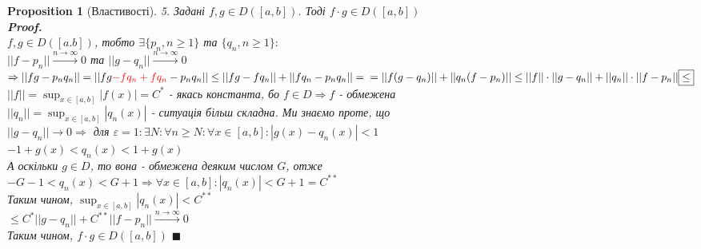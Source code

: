 \documentclass[a4paper, 14pt]{extarticle}
\def\huge{\displaystyle}
\def\bigline{\vspace{5mm}\\}
\theoremstyle{theoremdd}
\theoremstyle{theoremdd}
\theoremstyle{theoremdd}
\theoremstyle{theoremdd}
\theoremstyle{theoremdd}
\newtheorem{proposition}[theorem]{Proposition}
\theoremstyle{theoremdd}
\theoremstyle{theoremdd}
\theoremstyle{theoremdd}
\newenvironment{pfNoTh}{\textbf{Proof. \\}}{$\blacksquare$}
\begin{document}
\begin{proposition}[Властивості]
5. Задані $f,g \in D([a,b])$. Тоді $f \cdot g \in D([a,b])$\\
\begin{pfNoTh}
$f,g \in D([a.b])$, тобто $\exists \{p_n, n \geq 1\}$ та $\{q_n, n \geq 1\}:$\\
$||f-p_n|| \overset{n \to \infty}{\longrightarrow} 0$ та $||g-q_n|| \overset{n \to \infty}{\longrightarrow} 0$\\
$\Rightarrow ||fg - p_n q_n|| = ||fg \textcolor{red}{- fq_n + fq_n} - p_n q_n|| \leq ||fg - fq_n|| + ||fq_n - p_nq_n|| = \\ = ||f(g-q_n)|| + ||q_n(f-p_n)|| \leq ||f|| \cdot ||g-q_n|| + ||q_n|| \cdot ||f-p_n|| \boxed{\leq}$\\
$||f|| = \huge \sup_{x \in [a,b]} |f(x)| = C^*$ - якась константа, бо $f \in D \Rightarrow f$ - обмежена\\
$||q_n|| = \huge \sup_{x \in [a,b]} |q_n(x)|$ - ситуація більш складна. Ми знаємо проте, що\\
$||g - q_n|| \to 0 \Rightarrow$ для $\varepsilon = 1: \exists N: \forall n \geq N: \forall x \in [a,b]: |g(x)-q_n(x)| < 1$\\
$-1 + g(x) < q_n(x) < 1 + g(x)$\\
А оскільки $g \in D$, то вона - обмежена деяким числом $G$, отже\\
$-G-1 < q_n(x) < G+1 \Rightarrow \forall x \in [a,b]: |q_n(x)| < G+1 = C^{**}$\\
Таким чином, $\huge\sup_{x \in [a,b]} |q_n(x)| < C^{**}$\\
$\boxed{\leq} C^* ||g-q_n|| + C^{**} ||f-p_n|| \overset{n \to \infty}{\longrightarrow} 0$\\
Таким чином, $f \cdot g \in D([a,b])$
\end{pfNoTh}
\bigline


\end{proposition}
\end{document}
